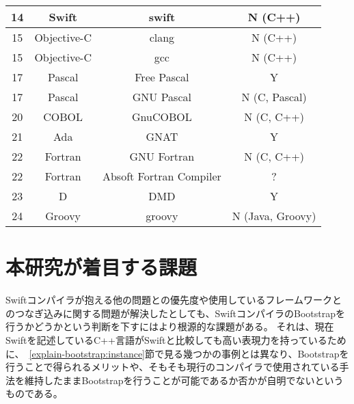 \begin{table}[tb]
\begin{center}
\begin{tabular}{|c|c|c|c|}
            \hline
            14 & Swift & swift & N (C++) \\
            \hline
            15 & Objective-C & clang & N (C++) \\
            \hline
            15 & Objective-C & gcc & N (C++) \\
            \hline
            17 & Pascal & Free Pascal & Y \\
            \hline
            17 & Pascal & GNU Pascal & N (C, Pascal) \\
            \hline
            20 & COBOL & GnuCOBOL & N (C, C++) \\
            \hline
            21 & Ada & GNAT & Y \\
            \hline
            22 & Fortran & GNU Fortran & N (C, C++) \\
            \hline
            22 & Fortran & Absoft Fortran Compiler & ? \\
            \hline
            23 & D & DMD & Y \\
            \hline
            24 & Groovy & groovy & N (Java, Groovy) \\
            \hline
        \end{tabular}
        \label{table:bootstrapping-languages}
    \end{center}
\end{table}



\section{本研究が着目する課題}
\label{introduction:issue}

Swiftコンパイラが抱える他の問題との優先度や使用しているフレームワークとのつなぎ込みに関する問題が解決したとしても、SwiftコンパイラのBootstrapを行うかどうかという判断を下すにはより根源的な課題がある。
それは、現在Swiftを記述しているC++言語がSwiftと比較しても高い表現力を持っているために、~\ref{explain-bootstrap:instance}節で見る幾つかの事例とは異なり、Bootstrapを行うことで得られるメリットや、そもそも現行のコンパイラで使用されている手法を維持したままBootstrapを行うことが可能であるか否かが自明でないというものである。

